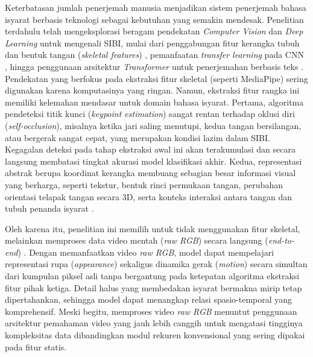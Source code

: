 Keterbatasan jumlah penerjemah manusia menjadikan sistem penerjemah bahasa isyarat berbasis teknologi sebagai kebutuhan yang semakin mendesak. Penelitian terdahulu telah mengeksplorasi beragam pendekatan \textit{Computer Vision} dan \textit{Deep Learning} untuk mengenali SIBI, mulai dari penggabungan fitur kerangka tubuh dan bentuk tangan (\textit{skeletal features}) \cite{RakunSetyono2022}, pemanfaatan \textit{transfer learning} pada CNN \cite{Pratama2025}, hingga penggunaan arsitektur \textit{Transformer} untuk penerjemahan berbasis teks \cite{Aurelrius2025}. Pendekatan yang berfokus pada ekstraksi fitur skeletal (seperti MediaPipe) sering digunakan karena komputasinya yang ringan. Namun, ekstraksi fitur rangka ini memiliki kelemahan mendasar untuk domain bahasa isyarat. Pertama, algoritma pendeteksi titik kunci (\textit{keypoint estimation}) sangat rentan terhadap oklusi diri (\textit{self-occlusion}), misalnya ketika jari saling menutupi, kedua tangan bersilangan, atau bergerak sangat cepat, yang merupakan kondisi lazim dalam SIBI. Kegagalan deteksi pada tahap ekstraksi awal ini akan terakumulasi dan secara langsung membatasi tingkat akurasi model klasifikasi akhir. Kedua, representasi abstrak berupa koordinat kerangka membuang sebagian besar informasi visual yang berharga, seperti tekstur, bentuk rinci permukaan tangan, perubahan orientasi telapak tangan secara 3D, serta konteks interaksi antara tangan dan tubuh penanda isyarat \cite{Li2020WLASL}.\par

Oleh karena itu, penelitian ini memilih untuk tidak menggunakan fitur skeletal, melainkan memproses data video mentah (\textit{raw RGB}) secara langsung (\textit{end-to-end}) \cite{Tong2022VideoMAE, Carreira2017I3D}. Dengan memanfaatkan video \textit{raw RGB}, model dapat mempelajari representasi rupa (\textit{appearance}) sekaligus dinamika gerak (\textit{motion}) secara simultan dari kumpulan piksel asli tanpa bergantung pada ketepatan algoritma ekstraksi fitur pihak ketiga. Detail halus yang membedakan isyarat bermakna mirip tetap dipertahankan, sehingga model dapat menangkap relasi spasio-temporal yang komprehensif. Meski begitu, memproses video \textit{raw RGB} menuntut penggunaan arsitektur pemahaman video yang jauh lebih canggih untuk mengatasi tingginya kompleksitas data dibandingkan modul rekuren konvensional yang sering dipakai pada fitur statis.\par

